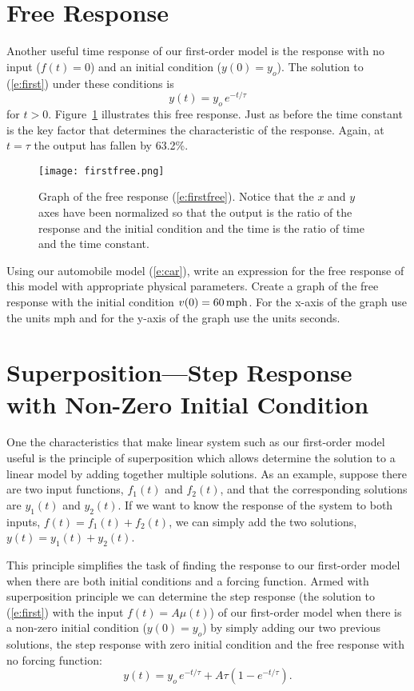 \section{Free Response}
Another useful time response of our first-order model is the response with no input ($f(t)=0$) and an initial condition ($y(0)=y_o$).  The solution to (\ref{e:first}) under these conditions is 
\begin{equation}\label{e:firstfree}
y(t) = y_o \, e^{-t/\tau}
\end{equation}
for $t>0$. Figure~\ref{f:firstfree} illustrates this free response.  Just as before the time constant is the key factor that determines the characteristic of the response.  Again, at $t=\tau$ the output has fallen by 63.2\%.
\begin{figure}[hbt]
\centering
\texttt{[image: firstfree.png]}
\caption{Graph of the free response (\ref{e:firstfree}).  Notice that the $x$ and $y$ axes have been normalized so that the output is the ratio of the response and the initial condition and the time is the ratio of time and the time constant.}
\label{f:firstfree}
\end{figure}

\begin{ex}
Using our automobile model (\ref{e:car}), write an expression for the free response of this model with appropriate physical parameters.  Create a graph of the free response with the initial condition $v(0)=\unit[60]{mph}$. For the x-axis of the graph use the units mph and for the y-axis of the graph use the units seconds.
\end{ex}

\section{Superposition---Step Response with Non-Zero Initial Condition}
One the characteristics that make linear system such as our first-order model useful is the principle of \gls{superposition} which allows determine the solution to a linear model by adding together multiple solutions.  As an example, suppose there are two input functions, $f_1(t)$ and $f_2(t)$, and that the corresponding solutions are $y_1(t)$ and $y_2(t)$.  If we want to know the response of the system to both inputs, $f(t)=f_1(t)+f_2(t)$, we can simply add the two solutions, $y(t)=y_1(t)+y_2(t)$. 

This principle simplifies the task of finding the response to our first-order model when there are both initial conditions and a forcing function.  Armed with superposition principle we can determine the step response (the solution to (\ref{e:first}) with the input $f(t)=A\mu(t)$) of our first-order model when there is a non-zero initial condition ($y(0)=y_o$) by simply adding our two previous solutions, the step response with zero initial condition and the free response with no forcing function:
\begin{equation}
y(t) = y_o \, e^{-t/\tau} + A\tau\left(1-e^{-t/\tau}\right).
\end{equation}


